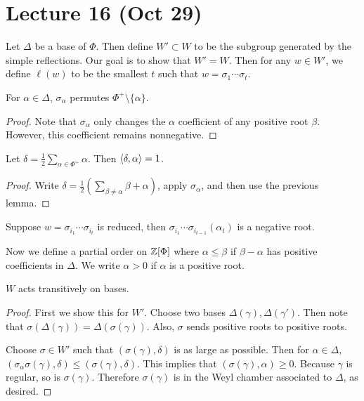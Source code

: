 \documentclass[twoside, 10pt]{article}
\begin{document}
    \section{Lecture 16 (Oct 29)}%
    
    Let $\Delta$ be a base of $\Phi$. Then define $W' \subset W$ to be the
    subgroup generated by the simple reflections. Our goal is to show that $W'
    = W$. Then for any $w \in W'$, we define $\ell(w)$ to be the smallest $t$
    such that $w = \sigma_1 \cdots \sigma_t$.

    \begin{lem} For $\alpha \in \Delta$, $\sigma_{\alpha}$ permutes $\Phi^+
    \setminus \{\alpha\}$.  \end{lem}

    \begin{proof} Note that $\sigma_{\alpha}$ only changes the $\alpha$
    coefficient of any positive root $\beta$. However, this coefficient remains
nonnegative.  \end{proof}

    \begin{lem} Let $\delta = \frac{1}{2} \sum_{\alpha \in \Phi^+} \alpha$.
    Then $\langle\delta, \alpha\rangle = 1$.  \end{lem}

    \begin{proof} Write $\delta = \frac{1}{2} \left( \sum_{\beta \neq \alpha}
    \beta + \alpha\right)$, apply $\sigma_{\alpha}$, and then use the previous
lemma.  \end{proof}

    \begin{lem} Suppose $w = \sigma_{i_1} \cdots \sigma_{i_t}$ is reduced, then
    $\sigma_{i_1} \cdots \sigma_{i_{t-1}}(\alpha_t)$ is a negative root.
\end{lem}

    Now we define a partial order on $\mathbb{Z}[\Phi]$ where $\alpha \leq \beta$ if
    $\beta - \alpha$ has positive coefficients in $\Delta$. We write $\alpha >
    0$ if $\alpha$ is a positive root.

    \begin{prop} $W$ acts transitively on bases.  \end{prop}

    \begin{proof} First we show this for $W'$. Choose two bases
        $\Delta(\gamma), \Delta(\gamma')$. Then note that
        $\sigma(\Delta(\gamma)) = \Delta(\sigma(\gamma))$. Also, $\sigma$ sends
        positive roots to positive roots.

        Choose $\sigma \in W'$ such that $(\sigma(\gamma), \delta)$ is as large
    as possible. Then for $\alpha \in \Delta$, $(\sigma_{\alpha}\sigma(\gamma),
\delta) \leq (\sigma(\gamma),\delta)$. This implies that
$(\sigma(\gamma),\alpha) \geq 0$. Because $\gamma$ is regular, so is
$\sigma(\gamma)$. Therefore $\sigma(\gamma)$ is in the Weyl chamber associated
to $\Delta$, as desired.  \end{proof}
\end{document}
